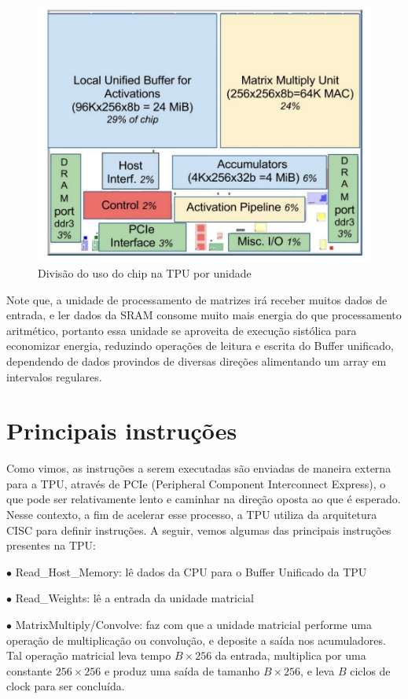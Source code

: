 \documentclass{report}
\begin{document}
\begin{figure}[h]
	\includegraphics[scale=0.7]{floor-plan}
	\centering
	\caption{Divisão do uso do chip na TPU por unidade}
\end{figure}

Note que, a unidade de processamento de matrizes irá receber muitos dados de entrada, e ler dados da SRAM consome muito mais energia do que processamento aritmético, portanto essa unidade se aproveita de execução sistólica para economizar energia, reduzindo operações de leitura e escrita do Buffer unificado, dependendo de dados provindos de diversas direções alimentando um array em intervalos regulares.

\section{Principais instruções}

Como vimos, as instruções a serem executadas são enviadas de maneira externa para a TPU, através de PCIe (Peripheral Component Interconnect Express), o que pode ser relativamente lento e caminhar na direção oposta ao que é esperado. Nesse contexto, a fim de acelerar esse processo, a TPU utiliza da arquitetura CISC para definir instruções. A seguir, vemos algumas das principais instruções presentes na TPU:

$\bullet$ Read\_Host\_Memory: lê dados da CPU para o Buffer Unificado da TPU

$\bullet$ Read\_Weights: lê a entrada da unidade matricial

$\bullet$ MatrixMultiply/Convolve: faz com que a unidade matricial performe uma operação de multiplicação ou convolução, e deposite a saída nos acumuladores. Tal operação matricial leva tempo $B \times 256$ da entrada, multiplica por uma constante $256 \times 256$ e produz uma saída de tamanho $B \times 256$, e leva $B$ ciclos de clock para ser concluída.
\end{document}
